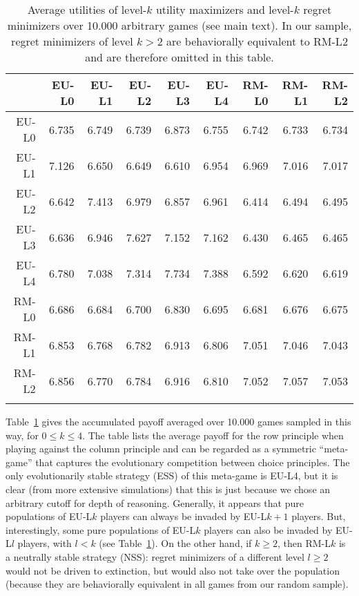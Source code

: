 \documentclass{llncs}
\begin{document}
 

\begin{table}[t]
  \centering
\begin{tabular}{rrrrrrrrr}
  \hline
 & EU-L0 & EU-L1 & EU-L2 & EU-L3 & EU-L4 & RM-L0 & RM-L1 & RM-L2 \\ 
  \hline
  EU-L0 & 6.735 & 6.749 & 6.739 & 6.873 & 6.755 & 6.742 & 6.733 & 6.734 \\ 
  EU-L1 & 7.126 & 6.650 & 6.649 & 6.610 & 6.954 & 6.969 & 7.016 & 7.017 \\ 
  EU-L2 & 6.642 & 7.413 & 6.979 & 6.857 & 6.961 & 6.414 & 6.494 & 6.495 \\ 
  EU-L3 & 6.636 & 6.946 & 7.627 & 7.152 & 7.162 & 6.430 & 6.465 & 6.465 \\ 
  EU-L4 & 6.780 & 7.038 & 7.314 & 7.734 & 7.388 & 6.592 & 6.620 & 6.619 \\ 
  RM-L0 & 6.686 & 6.684 & 6.700 & 6.830 & 6.695 & 6.681 & 6.676 & 6.675 \\ 
  RM-L1 & 6.853 & 6.768 & 6.782 & 6.913 & 6.806 & 7.051 & 7.046 & 7.043 \\ 
  RM-L2 & 6.856 & 6.770 & 6.784 & 6.916 & 6.810 & 7.052 & 7.057 & 7.053 \\ 
   \hline \\
\end{tabular}
\caption{Average utilities of level-$k$ utility maximizers and
  level-$k$ regret minimizers over 10.000 arbitrary games (see main
  text). In our sample, regret minimizers of level $k>2$ are
  behaviorally equivalent to RM-L$2$ and are therefore omitted in this table. } 
  \label{tab:MaxUtil}
\end{table}
 
Table~\ref{tab:MaxUtil} gives the accumulated payoff averaged over
10.000 games sampled in this way, for $0 \le k \le 4$. The table lists
the average payoff for the row principle when playing against the
column principle and can be regarded as a symmetric ``meta-game'' that
captures the evolutionary competition between choice principles. The
only evolutionarily stable strategy (ESS) of this meta-game is EU-L4,
but it is clear (from more extensive simulations) that this is just
because we chose an arbitrary cutoff for depth of
reasoning. Generally, it appears that pure populations of EU-L$k$
players can always be invaded by EU-L$k+1$ players. But,
interestingly, some pure populations of EU-L$k$ players can also be
invaded by EU-L$l$ players, with $l<k$ (see
Table~\ref{tab:MaxUtil}). On the other hand, if $k\ge2$, then RM-L$k$
is a neutrally stable strategy (NSS): regret minimizers of a different
level $l\ge2$ would not be driven to extinction, but would also not
take over the population (because they are behaviorally equivalent in
all games from our random sample).
\end{document}
